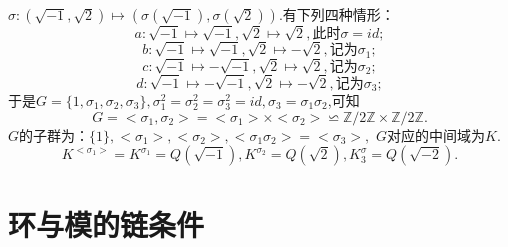 \documentclass[UTF8]{article}
\begin{document}
$\sigma:(\sqrt{-1},\sqrt{2})\longmapsto (\sigma(\sqrt{-1}),\sigma(\sqrt{2}))$.有下列四种情形：
$$a:\sqrt{-1}\longmapsto\sqrt{-1},\sqrt{2}\longmapsto\sqrt{2},\text{此时}\sigma=id;$$
$$b:\sqrt{-1}\longmapsto\sqrt{-1},\sqrt{2}\longmapsto-\sqrt{2},\text{记为}\sigma_1;$$
$$c:\sqrt{-1}\longmapsto-\sqrt{-1},\sqrt{2}\longmapsto\sqrt{2},\text{记为}\sigma_2;$$
$$d:\sqrt{-1}\longmapsto-\sqrt{-1},\sqrt{2}\longmapsto-\sqrt{2},\text{记为}\sigma_3;$$
于是$G=\{1,\sigma_1,\sigma_2,\sigma_3\},\sigma_1^2=\sigma_2^2=\sigma_3^2=id,\sigma_3=\sigma_1\sigma_2$,可知
$$G=<\sigma_1,\sigma_2>=<\sigma_1>\times<\sigma_2>\backsimeq  \mathbb{Z}/2\mathbb{Z}\times \mathbb{Z}/2\mathbb{Z}.$$
$G$的子群为：$\{1\},<\sigma_1>,<\sigma_2>,<\sigma_1\sigma_2>=<\sigma_3>,$ $G$对应的中间域为$K$.\\
$$K^{<\sigma_1>}=K^{\sigma_1}=Q(\sqrt{-1}),K^{\sigma_2}=Q(\sqrt{2}),K^\sigma_3=Q(\sqrt{-2}).$$
\section{环与模的链条件}
\end{document}
